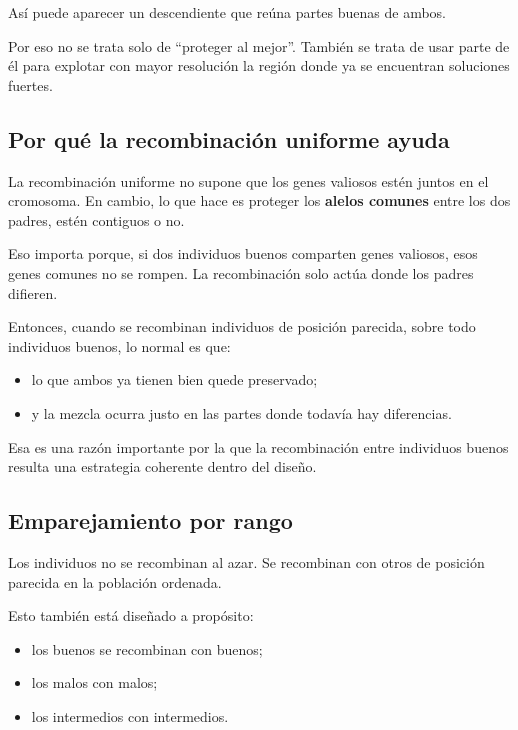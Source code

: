 \documentclass[11pt]{article}
\begin{document}
As\'i puede aparecer un descendiente que re\'una partes buenas de ambos.

Por eso no se trata solo de ``proteger al mejor''. Tambi\'en se trata de usar
parte de \'el para explotar con mayor resoluci\'on la regi\'on donde ya se
encuentran soluciones fuertes.

\subsection{Por qu\'e la recombinaci\'on uniforme ayuda}

La recombinaci\'on uniforme no supone que los genes valiosos est\'en juntos en
el cromosoma. En cambio, lo que hace es proteger los \textbf{alelos comunes}
entre los dos padres, est\'en contiguos o no.

Eso importa porque, si dos individuos buenos comparten genes valiosos, esos
genes comunes no se rompen. La recombinaci\'on solo act\'ua donde los padres
difieren.

Entonces, cuando se recombinan individuos de posici\'on parecida, sobre todo
individuos buenos, lo normal es que:

\begin{itemize}
  \item lo que ambos ya tienen bien quede preservado;
  \item y la mezcla ocurra justo en las partes donde todav\'ia hay diferencias.
\end{itemize}

Esa es una raz\'on importante por la que la recombinaci\'on entre individuos
buenos resulta una estrategia coherente dentro del dise\~no.

\subsection{Emparejamiento por rango}

Los individuos no se recombinan al azar. Se recombinan con otros de posici\'on
parecida en la poblaci\'on ordenada.

Esto tambi\'en est\'a dise\~nado a prop\'osito:

\begin{itemize}
  \item los buenos se recombinan con buenos;
  \item los malos con malos;
  \item los intermedios con intermedios.
\end{itemize}
\end{document}
